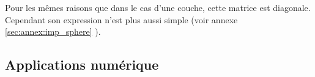         Pour les mêmes raisons que dans le cas d'une couche, cette matrice est diagonale. Cependant son expression n'est plus aussi simple (voir annexe \ref{sec:annex:imp_sphere} ).

  \subsection{Applications numérique}

